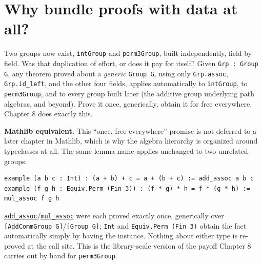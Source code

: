 \section{Why bundle proofs with data at all?}\label{sec:07-groups:06-why-bundle:1}

Two groups now exist, \texttt{intGroup} and \texttt{perm3Group}, built independently, field by field. Was that duplication of effort, or does it pay for itself? Given \texttt{Grp : Group G}, any theorem proved about a \emph{generic} \texttt{Group G}, using only \texttt{Grp.assoc}, \texttt{Grp.id\_\allowbreak{}left}, and the other four fields, applies automatically to \texttt{intGroup}, to \texttt{perm3Group}, and to every group built later (the additive group underlying path algebras, and beyond). Prove it once, generically, obtain it for free everywhere. Chapter 8 does exactly this.

\textbf{Mathlib equivalent.} This ``once, free everywhere'' promise is not deferred to a later chapter in Mathlib, which is why the algebra hierarchy is organized around typeclasses at all. The same lemma name applies unchanged to two unrelated groups.

\begin{lstlisting}
example (a b c : Int) : (a + b) + c = a + (b + c) := add_assoc a b c
example (f g h : Equiv.Perm (Fin 3)) : (f * g) * h = f * (g * h) := mul_assoc f g h
\end{lstlisting}

\href{https://loogle.lean-lang.org/?q=add_assoc}{\texttt{add\_\allowbreak{}assoc}}/\href{https://loogle.lean-lang.org/?q=mul_assoc}{\texttt{mul\_\allowbreak{}assoc}} were each proved exactly once, generically over \texttt{[AddCommGroup G]}/\texttt{[Group G]}; \texttt{Int} and \texttt{Equiv.Perm (Fin 3)} obtain the fact automatically simply by having the instance. Nothing about either type is re-proved at the call site. This is the library-scale version of the payoff Chapter 8 carries out by hand for \texttt{perm3Group}.
